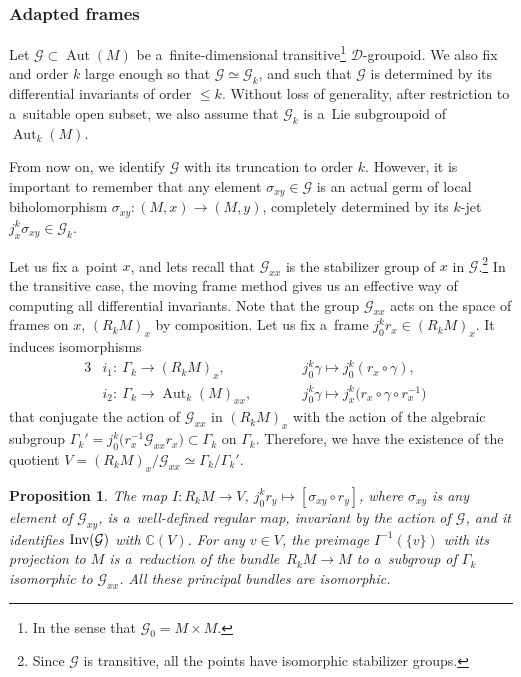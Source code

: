 \documentclass[pdftex]{sigma}
\numberwithin{equation}{section}
\newtheorem{Proposition}[Theorem]{Proposition}
\theoremstyle{definition}
\begin{document}
\subsubsection{Adapted frames}

Let $\mathcal G\subset \operatorname{Aut}(M)$ be a~finite-dimensional transitive\footnote{In the sense that $\mathcal G_{0} = M\times M$.} $\mathcal D$-groupoid. We also fix and order $k$ large enough so that $\mathcal G\simeq \mathcal G_k$, and such that $\mathcal G$ is determined by its differential invariants of order $\leq k$. Without loss of generality, after restriction to a~suitable open subset, we also assume that $\mathcal G_k$ is a~Lie subgroupoid of $\operatorname{Aut}_k(M)$.

From now on, we identify $\mathcal G$ with its truncation to order $k$. However, it is important to remember that any element $\sigma_{xy}\in \mathcal G$ is an actual germ of local biholomorphism ${\sigma_{xy}\colon (M,x)\to (M,y)}$, completely determined by its $k$-jet $j^k_x\sigma_{xy}\in \mathcal G_k$.

Let us fix a~point $x$, and lets recall that $\mathcal G_{xx}$ is the stabilizer group of $x$ in $\mathcal G$.\footnote{Since $\mathcal G$ is transitive, all the points have isomorphic stabilizer groups.}
In the transitive case, the moving frame method gives us an effective way of computing all differential invariants. Note that the group $\mathcal G_{xx}$ acts on the space of frames on $x$, $(R_kM)_x$ by composition. Let us fix a~frame $j_0^kr_x \in (R_kM)_x$. It induces isomorphisms
\begin{alignat*}{3}
& i_1\colon\ \Gamma_k \to (R_kM)_x, \qquad&& j_0^k\gamma \mapsto j_0^k(r_x \circ \gamma),&
\\
& i_2 \colon\ \Gamma_k \to \operatorname{Aut}_k(M)_{xx}, \qquad&& j_0^k\gamma \mapsto j_x^k\bigl(r_x \circ \gamma\circ r_x^{-1}\bigr)&
\end{alignat*}
that conjugate the action of $\mathcal G_{xx}$ in $(R_kM)_x$ with the action of the algebraic subgroup $\Gamma_k' = j_0^k\bigl(r_{x}^{-1}\mathcal G_{xx}r_x\bigr) \subset \Gamma_k$ on $\Gamma_k$. Therefore, we have the existence of the quotient $V = (R_kM)_x/\mathcal G_{xx} \simeq \Gamma_k/\Gamma_k'$.

\begin{Proposition}\label{prop_dinvariant}
 The map $I\colon R_kM \to V$, $ j_0^kr_y \mapsto [\sigma_{xy}\circ r_y]$,
where $\sigma_{xy}$ is any element of $\mathcal G_{xy}$, is a~well-defined regular map, invariant by the action of $\mathcal G$, and it identifies ${\rm Inv}(\mathcal G)$ with $\mathbb C(V)$. For any $v\in V$, the preimage $I^{-1}(\{v\})$ with its projection to $M$ is a~reduction of the bundle~${R_kM\to M}$ to a~subgroup of $\Gamma_k$ isomorphic to $\mathcal G_{xx}$. All these principal bundles are isomorphic.
\end{Proposition}
\end{document}
